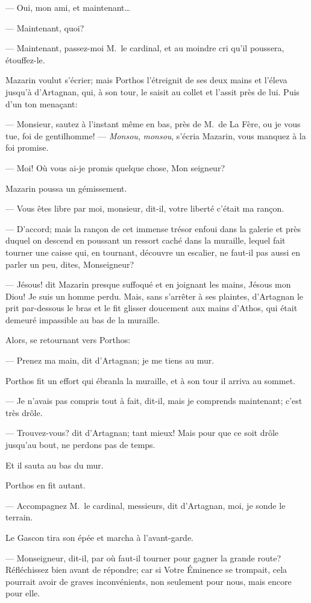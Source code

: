 — Oui, mon ami, et maintenant\dots

— Maintenant, quoi?

— Maintenant, passez-moi M.~le cardinal, et au moindre cri qu'il poussera, étouffez-le.

Mazarin voulut s'écrier; mais Porthos l'étreignit de ses deux mains et l'éleva jusqu'à d'Artagnan, qui, à son tour, le saisit au collet et l'assit près de lui. Puis d'un ton menaçant:

— Monsieur, sautez à l'instant même en bas, près de M.~de La Fère, ou je vous tue, foi de gentilhomme!
— \textit{Monsou}, \textit{monsou}, s'écria Mazarin, vous manquez à la foi promise.

— Moi! Où vous ai-je promis quelque chose, Mon seigneur?

Mazarin poussa un gémissement.

— Vous êtes libre par moi, monsieur, dit-il, votre liberté c'était ma rançon.

— D'accord; mais la rançon de cet immense trésor enfoui dans la galerie et près duquel on descend en poussant un ressort caché dans la muraille, lequel fait tourner une caisse qui, en tournant, découvre un escalier, ne faut-il pas aussi en parler un peu, dites, Monseigneur?

— Jésous! dit Mazarin presque suffoqué et en joignant les mains, Jésous mon Diou! Je suis un homme perdu.
Mais, sans s'arrêter à ses plaintes, d'Artagnan le prit par-dessous le bras et le fit glisser doucement aux mains d'Athos, qui était demeuré impassible au bas de la muraille.

Alors, se retournant vers Porthos:

— Prenez ma main, dit d'Artagnan; je me tiens au mur.

Porthos fit un effort qui ébranla la muraille, et à son tour il arriva au sommet.

— Je n'avais pas compris tout à fait, dit-il, mais je comprends maintenant; c'est très drôle.

— Trouvez-vous? dit d'Artagnan; tant mieux! Mais pour que ce soit drôle jusqu'au bout, ne perdons pas de temps.

Et il sauta au bas du mur.

Porthos en fit autant.

— Accompagnez M.~le cardinal, messieurs, dit d'Artagnan, moi, je sonde le terrain.

Le Gascon tira son épée et marcha à l'avant-garde.

— Monseigneur, dit-il, par où faut-il tourner pour gagner la grande route? Réfléchissez bien avant de répondre; car si Votre Éminence se trompait, cela pourrait avoir de graves inconvénients, non seulement pour nous, mais encore pour elle.

